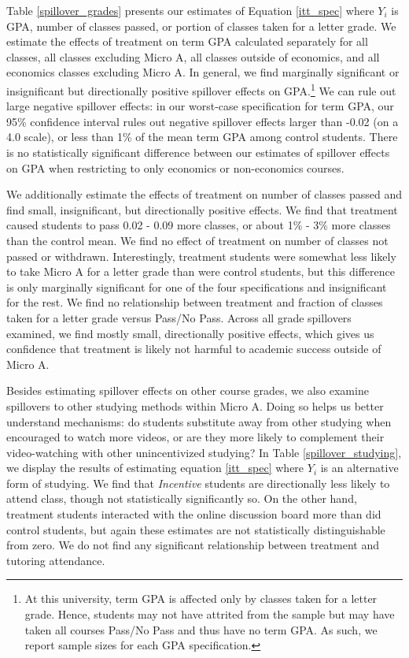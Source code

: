 \documentclass[12pt]{article}
\begin{document}
Table \ref{spillover_grades} presents our estimates of Equation \ref{itt_spec} where $Y_i$ is GPA, number of classes passed, or portion of classes taken for a letter grade. We estimate the effects of treatment on term GPA calculated separately for all classes, all classes excluding Micro A, all classes outside of economics, and all economics classes excluding Micro A. In general, we find marginally significant or insignificant but directionally positive spillover effects on GPA.\footnote{At this university, term GPA is affected only by classes taken for a letter grade. Hence, students may not have attrited from the sample but may have taken all courses Pass/No Pass and thus have no term GPA. As such, we report sample sizes for each GPA specification.} We can rule out large negative spillover effects: in our worst-case specification for term GPA, our 95\% confidence interval rules out negative spillover effects larger than -0.02 (on a 4.0 scale), or less than 1\% of the mean term GPA among control students. There is no statistically significant difference between our estimates of spillover effects on GPA when restricting to only economics or non-economics courses.

We additionally estimate the effects of treatment on number of classes passed and find small, insignificant, but directionally positive effects. We find that treatment caused students to pass 0.02 - 0.09 more classes, or about 1\% - 3\% more classes than the control mean. We find no effect of treatment on number of classes not passed or withdrawn. Interestingly, treatment students were somewhat less likely to take Micro A for a letter grade than were control students, but this difference is only marginally significant for one of the four specifications and insignificant for the rest. We find no relationship between treatment and fraction of classes taken for a letter grade versus Pass/No Pass. Across all grade spillovers examined, we find mostly small, directionally positive effects, which gives us confidence that treatment is likely not harmful to academic success outside of Micro A.

Besides estimating spillover effects on other course grades, we also examine spillovers to other studying methods within Micro A. Doing so helps us better understand mechanisms: do students substitute away from other studying when encouraged to watch more videos, or are they more likely to complement their video-watching with other unincentivized studying? In Table \ref{spillover_studying}, we display the results of estimating equation \ref{itt_spec} where $Y_i$ is an alternative form of studying. We find that \textit{Incentive} students are directionally less likely to attend class, though not statistically significantly so. On the other hand, treatment students interacted with the online discussion board more than did control students, but again these estimates are not statistically distinguishable from zero. We do not find any significant relationship between treatment and tutoring attendance.
\end{document}
